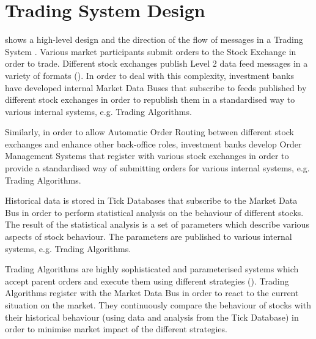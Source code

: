 \section{Trading System Design} 



 shows a high-level design and the direction of the flow of messages in a Trading System \cite{Cisco}. Various market participants submit orders to the Stock Exchange in order to trade. Different stock exchanges publish Level 2 data feed messages in a variety of formats (). In order to deal with this complexity, investment banks have developed internal Market Data Buses that subscribe to feeds published by different stock exchanges in order to republish them in a standardised way to various internal systems, e.g. Trading Algorithms.

Similarly, in order to allow Automatic Order Routing between different stock exchanges and enhance other back-office roles, investment banks develop Order Management Systems that register with various stock exchanges in order to provide a standardised way of submitting orders for various internal systems, e.g. Trading Algorithms.

Historical data is stored in Tick Databases that subscribe to the Market Data Bus in order to perform statistical analysis on the behaviour of different stocks. The result of the statistical analysis is a set of parameters which describe various aspects of stock behaviour. The parameters are published to various internal systems, e.g. Trading Algorithms.

Trading Algorithms are highly sophisticated and parameterised systems which accept parent orders and execute them using different strategies (). Trading Algorithms register with the Market Data Bus in order to react to the current situation on the market. They continuously compare the behaviour of stocks with their historical behaviour (using data and analysis from the Tick Database) in order to minimise market impact of the different strategies.
